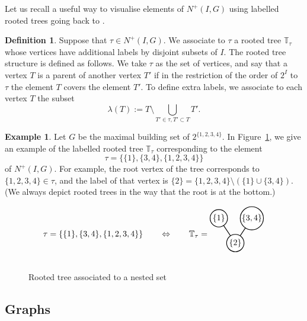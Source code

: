 \documentclass[11pt]{article}
\theoremstyle{definition}
\newtheorem{defi}[theo]{Definition}
\newtheorem{exam}[theo]{Example}
\numberwithin{equation}{section}
\begin{document}
Let us recall a useful way to visualise elements of $N^+(I,G)$ using labelled rooted trees going back to \cite{MR2191630,MR2487491}. 

\begin{defi}\label{def:lambda}
Suppose that $\tau\in N^+(I,G)$. We associate to $\tau$ a rooted tree $\mathbb{T}_\tau$ whose vertices have additional labels by disjoint subsets of $I$. The rooted tree structure is defined as follows. We take $\tau$ as the set of vertices, and say that a vertex $T$ is a parent of another vertex $T'$ if in the restriction of the order of $2^I$ to $\tau$ the element $T$ covers the element $T'$. To define extra labels, we associate to each vertex $T$ the subset 
 \[
\lambda(T):=T\setminus \bigcup_{T'\in \tau, T'\subset T} T' .
 \] 
\end{defi} 

\begin{exam}
Let $G$ be the maximal building set of $2^{\{1,2,3,4\}}$. In Figure~\ref{fig:nested-tree}, we give an example of the labelled rooted tree $\mathbb{T}_\tau$ corresponding to the element \[\tau=\{\{1\},\{3,4\},\{1,2,3,4\}\}\] of $N^+(I,G)$. For example, the root vertex of the tree corresponds to $\{1,2,3,4\}\in\tau$, and the label of that vertex is $\{2\}=\{1,2,3,4\}\setminus(\{1\}\cup \{3,4\})$. (We always depict rooted trees in the way that the root is at the bottom.) 
\begin{figure}
\caption{Rooted tree associated to a nested set}
\label{fig:nested-tree}
 \[
\tau=\{\{1\},\{3,4\},\{1,2,3,4\}\}
\qquad
\Leftrightarrow
\qquad
\mathbb{T}_\tau=\vcenter{\hbox{\begin{tikzpicture}[scale=0.7]
     \draw[thick] (0,0.5)--(-1,2);
     \draw[thick] (0,0.5)--(1,2);
     
     \draw[fill=white, thick] (0,0.5) circle [radius=15pt];
     \draw[fill=white, thick] (-1,2) circle [radius=15pt];
     \draw[fill=white, thick] (1,2) circle [radius=20pt];
    \node at (0,0.5) {\scalebox{1}{$\{2\}$}};
    \node at (-1,2) {\scalebox{1}{$\{1\}$}};
    \node at (1,2) {\scalebox{1}{$\{3,4\}$}};
    
    \node (n) at (0,-0.5) {};
    \end{tikzpicture}}}
 \]
 \end{figure}  
\end{exam}


\subsection{Graphs}\label{sec:graphs-def}
\end{document}
